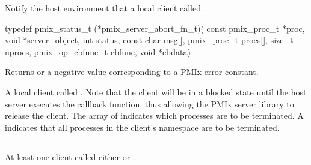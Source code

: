 \summary

Notify the host environment that a local client called .

\format

\cspecificstart
\begin{codepar}
typedef pmix_status_t (*pmix_server_abort_fn_t)(
                             const pmix_proc_t *proc,
                             void *server_object,
                             int status,
                             const char msg[],
                             pmix_proc_t procs[],
                             size_t nprocs,
                             pmix_op_cbfunc_t cbfunc,
                             void *cbdata)
\end{codepar}
\cspecificend


\begin{arglist}
\end{arglist}

Returns  or a negative value corresponding to a PMIx error constant.

\descr

A local client called .
Note that the client will be in a blocked state until the host server executes the callback function, thus allowing the \ac{PMIx} server library to release the client.
The array of  indicates which processes are to be terminated.
A  indicates that all processes in the client's namespace are to be terminated.


\subsection{}

\summary

At least one client called either  or .

